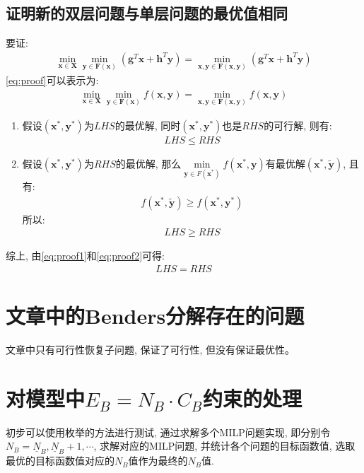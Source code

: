 \documentclass{article}
\begin{document}
\subsection{证明新的双层问题与单层问题的最优值相同}
要证:
\begin{align}
    \min\limits_{\boldsymbol{x}\in\boldsymbol{X}}\min\limits_{\boldsymbol{y}\in\boldsymbol{F(x)}} (\boldsymbol{g}^T\boldsymbol{x}+ \boldsymbol{h}^T\boldsymbol{y})=\min\limits_{\boldsymbol{x,y}\in\boldsymbol{F(x,y)}}(\boldsymbol{g}^T\boldsymbol{x}+\boldsymbol{h}^T\boldsymbol{y}) \label{eq:proof}
\end{align}
\eqref{eq:proof}可以表示为:
\begin{align}
    \min\limits_{\boldsymbol{x}\in\boldsymbol{X}}\min\limits_{\boldsymbol{y}\in\boldsymbol{F(x)}} f(\boldsymbol{x,y})=\min\limits_{\boldsymbol{x,y}\in\boldsymbol{F(x,y)}} f(\boldsymbol{x,y})
\end{align}
\begin{enumerate}
    \item 假设$(\boldsymbol{x^*,y^*})$为$LHS$的最优解, 同时$(\boldsymbol{x^*,y^*})$也是$RHS$的可行解, 则有:
    \begin{align}
        LHS\leq RHS \label{eq:proof1}
    \end{align}
    \item 假设$(\boldsymbol{x^*,y^*})$为$RHS$的最优解, 那么$\min\limits_{\boldsymbol{y}\in F(\boldsymbol{x^*})}f(\boldsymbol{x^*,y})$有最优解$(\boldsymbol{x^*,\widetilde{y}})$, 且有:
    \begin{align}
        f(\boldsymbol{x^*,\widetilde{y}})\geq f(\boldsymbol{x^*,y^*})
    \end{align}
    所以:
    \begin{align}
        LHS\geq RHS \label{eq:proof2}
    \end{align}
\end{enumerate}
综上, 由\eqref{eq:proof1}和\eqref{eq:proof2}可得:
\begin{align}
    LHS=RHS
\end{align}




\section{文章中的Benders分解存在的问题}
文章中只有可行性恢复子问题, 保证了可行性, 但没有保证最优性。

\section{对模型中\texorpdfstring{$E_B=N_B\cdot C_B$}.约束的处理}
初步可以使用枚举的方法进行测试, 通过求解多个MILP问题实现, 即分别令$N_B=\underline{N}_B,\underline{N}_B+1,\cdots$, 求解对应的MILP问题, 并统计各个问题的目标函数值, 选取最优的目标函数值对应的$N_B$值作为最终的$N_B$值.
\end{document}
